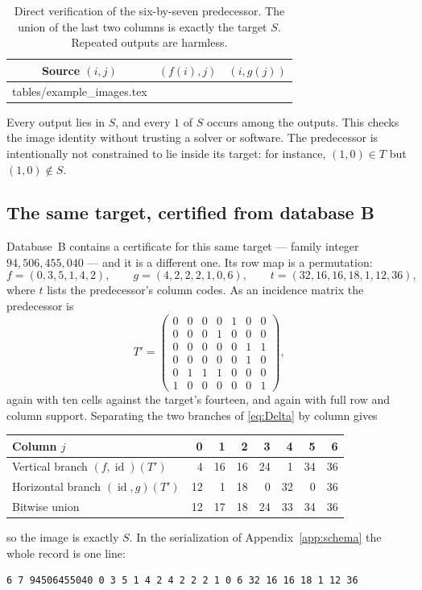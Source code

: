 \documentclass[11pt,letterpaper]{article}
\makeatletter
\numberwithin{equation}{section}
\theoremstyle{definition}
\theoremstyle{remark}
\newcommand{\id}{\operatorname{id}}
\newcommand{\code}[1]{\texttt{\detokenize{#1}}}
\newcommand{\dbB}{\textsf{B}}
\let\inputrows\@@input
\makeatother
\begin{document}
\begin{table}[H]
\centering
\caption{Direct verification of the six-by-seven predecessor. The union of
the last two columns is exactly the target $S$. Repeated outputs are harmless.}
\label{tab:example-images}
\begin{tabular}{ccc}
\toprule
Source $(i,j)$ & $(f(i),j)$ & $(i,g(j))$ \\
\midrule
\inputrows tables/example_images.tex 
\bottomrule
\end{tabular}
\end{table}

Every output lies in $S$, and every $1$ of $S$ occurs among the outputs.
This checks the image identity without trusting a solver or software.
The predecessor is intentionally not constrained to lie inside its target:
for instance, $(1,0)\in T$ but $(1,0)\notin S$.

\subsection{The same target, certified from database \dbB{}}
\label{sec:ex-theorem}
Database~\dbB{} contains a certificate for this same target --- family integer
$94{,}506{,}455{,}040$ --- and it is a different one. Its row map is a
permutation:
\[
 f=(0,3,5,1,4,2),\qquad
 g=(4,2,2,2,1,0,6),\qquad
 t=(32,16,16,18,1,12,36),
\]
where $t$ lists the predecessor's column codes. As an incidence matrix the
predecessor is
\begingroup\setlength{\arraycolsep}{3pt}
\[
 T'=\begin{pmatrix}
 0&0&0&0&1&0&0\\
 0&0&0&1&0&0&0\\
 0&0&0&0&0&1&1\\
 0&0&0&0&0&1&0\\
 0&1&1&1&0&0&0\\
 1&0&0&0&0&0&1
 \end{pmatrix},
\]
\endgroup
again with ten cells against the target's fourteen, and again with full row
and column support. Separating the two branches of \eqref{eq:Delta} by
column gives
\begin{center}
\begin{tabular}{lrrrrrrr}
\toprule
Column $j$ & 0&1&2&3&4&5&6\\
\midrule
Vertical branch $(f,\id)(T')$ &4&16&16&24&1&34&36\\
Horizontal branch $(\id,g)(T')$ &12&1&18&0&32&0&36\\
Bitwise union &12&17&18&24&33&34&36\\
\bottomrule
\end{tabular}
\end{center}
so the image is exactly $S$. In the \code{.cert} serialization of
Appendix~\ref{app:schema} the whole record is one line:
\begin{lstlisting}
6 7 94506455040 0 3 5 1 4 2 4 2 2 2 1 0 6 32 16 16 18 1 12 36
\end{lstlisting}
\end{document}
